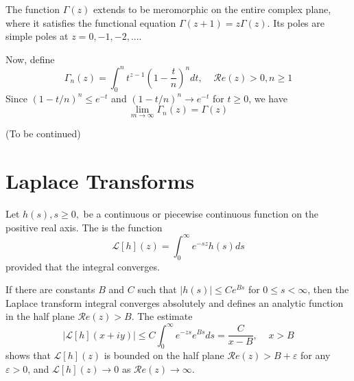 \begin{theorem}
    The function $\Gamma(z)$ extends to be meromorphic on the entire complex plane, where it satisfies the functional equation $\Gamma(z+1)=z\Gamma(z)$. Its poles are simple poles at $z = 0,-1,-2,...$.
\end{theorem}

Now, define \begin{equation*}
    \Gamma_n(z) = \int_0^nt^{z-1}\left(1-\frac{t}{n}\right)^ndt,\;\;\;\;\mathscr{R}e(z) > 0, n\geq 1
\end{equation*}
Since $(1-t/n)^n \leq e^{-t}$ and $(1-t/n)^n \rightarrow e^{-t}$ for $t \geq 0$, we have \begin{equation*}
    \lim\limits_{m\rightarrow \infty}\Gamma_n(z) = \Gamma(z)
\end{equation*}

(To be continued)



\section{Laplace Transforms}

\begin{definition}
    Let $h(s),s\geq0,$ be a continuous or piecewise continuous function on the positive real axis. The  is the function \begin{equation*}
        \mathcal{L}[h](z) = \int_0^{\infty}e^{-sz}h(s)ds
    \end{equation*}
    provided that the integral converges.
\end{definition}


\begin{proposition}
    If there are constants $B$ and $C$ such that $|h(s)| \leq Ce^{Bs}$ for $0 \leq s < \infty$, then the Laplace transform integral converges absolutely and defines an analytic function in the half plane $\mathscr{R}e(z) > B$. The estimate \begin{equation*}
        |\mathcal{L}[h](x+iy)| \leq C\int_0^{\infty}e^{-zs}e^{Bs}ds = \frac{C}{x-B},\;\;\;\; x > B
    \end{equation*}
    shows that $\mathcal{L}[h](z)$ is bounded on the half plane $\mathscr{R}e(z) > B+\varepsilon$ for any $\varepsilon > 0$, and $\mathcal{L}[h](z)\rightarrow 0$ as $\mathscr{R}e(z) \rightarrow \infty$.
\end{proposition}



